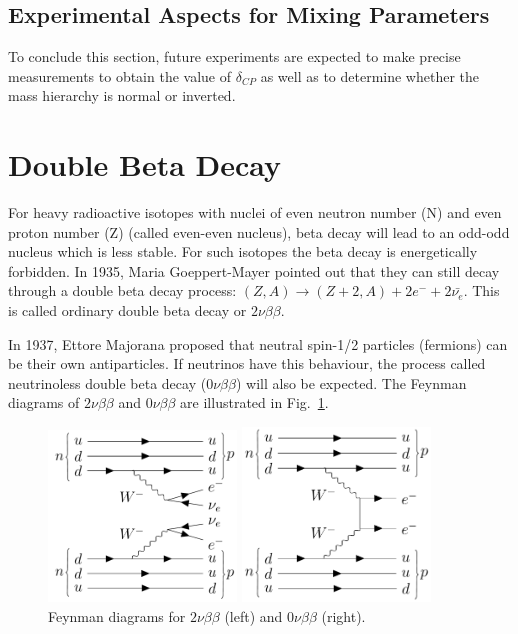 \documentclass[preprint,12pt]{elsarticle}
\numberwithin{equation}{section}
\begin{document}
\subsection{Experimental Aspects for Mixing Parameters}

To conclude this section, future experiments are expected to make precise measurements to obtain the value of $\delta_{CP}$ as well as to determine whether the mass hierarchy is normal or inverted.

\section{Double Beta Decay}

For heavy radioactive isotopes with nuclei of even neutron number (N) and even proton number (Z) (called even-even nucleus), beta decay will lead to an odd-odd nucleus which is less stable. For such isotopes the beta decay is energetically forbidden. In 1935, Maria Goeppert-Mayer pointed out that they can still decay through a double beta decay process: $(Z,A) \to (Z+2,A)+2e^{-}+2\bar{\nu_e}$. This is called ordinary double beta decay or $2\nu\beta\beta$\cite{martin}.

In 1937, Ettore Majorana proposed that neutral spin-1/2 particles (fermions) can be their own antiparticles\cite{majorana}. If neutrinos have this behaviour, the process called neutrinoless double beta decay ($0\nu\beta\beta$) will also be expected. The Feynman diagrams of $2\nu\beta\beta$ and $0\nu\beta\beta$ are illustrated in Fig.~\ref{feynman1}.

\begin{figure}[htbp]
	\centering	
	\begin{minipage}[t]{0.45\textwidth}
	\includegraphics[width=5cm]{doubleBeta2nu_feynman.png}
	\end{minipage}
	\begin{minipage}[t]{0.45\textwidth}
	\includegraphics[width=5cm]{doubleBeta_feynman.png}
	\end{minipage}
	\caption{ Feynman diagrams for $2\nu\beta\beta$ (left) and $0\nu\beta\beta$ (right).}
	\label{feynman1}
\end{figure}
\end{document}
